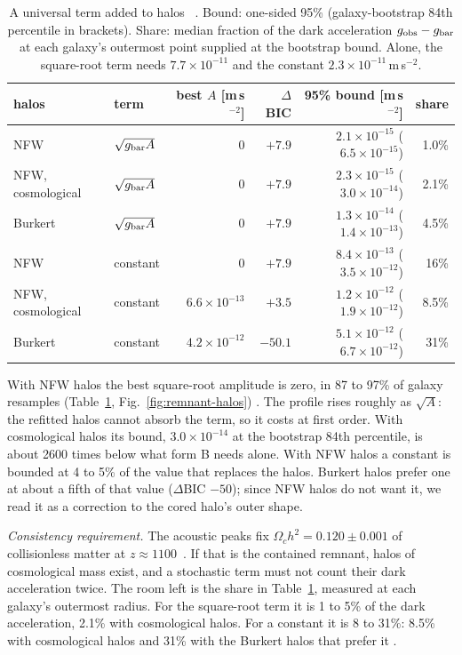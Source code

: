 \begin{table}[t]
\centering\footnotesize
\caption{A universal term added to halos \tagS\ . Bound: one-sided 95\% (galaxy-bootstrap 84th percentile in brackets).
Share: median fraction of the dark acceleration $g_{\rm obs}-g_{\rm bar}$ at each galaxy's outermost point supplied at the bootstrap bound.
Alone, the square-root term needs $7.7\times10^{-11}$ and the constant $2.3\times10^{-11}$\,m\,s$^{-2}$.}
\label{tab:remnant-joint}
\begin{tabular}{llrrrr}
\toprule
halos & term & best $A$ [m\,s$^{-2}$] & $\Delta$BIC & 95\% bound [m\,s$^{-2}$] & share\\
\midrule
NFW & $\sqrt{g_{\rm bar}A}$ & 0 & $+7.9$ & $2.1\times10^{-15}$ ($6.5\times10^{-15}$) & 1.0\%\\
NFW, cosmological & $\sqrt{g_{\rm bar}A}$ & 0 & $+7.9$ & $2.3\times10^{-15}$ ($3.0\times10^{-14}$) & 2.1\%\\
Burkert & $\sqrt{g_{\rm bar}A}$ & 0 & $+7.9$ & $1.3\times10^{-14}$ ($1.4\times10^{-13}$) & 4.5\%\\
NFW & constant & 0 & $+7.9$ & $8.4\times10^{-13}$ ($3.5\times10^{-12}$) & 16\%\\
NFW, cosmological & constant & $6.6\times10^{-13}$ & $+3.5$ & $1.2\times10^{-12}$ ($1.9\times10^{-12}$) & 8.5\%\\
Burkert & constant & $4.2\times10^{-12}$ & $-50.1$ & $5.1\times10^{-12}$ ($6.7\times10^{-12}$) & 31\%\\
\bottomrule
\end{tabular}
\end{table}

With NFW halos the best square-root amplitude is zero, in 87 to 97\% of galaxy resamples (Table~\ref{tab:remnant-joint},
Fig.~\ref{fig:remnant-halos}) \tagS. The profile rises roughly as $\sqrt A$: the refitted halos cannot absorb the term, so it costs at first
order. With cosmological halos its bound, $3.0\times10^{-14}$ at the bootstrap 84th percentile, is about 2600 times below what form B needs
alone. With NFW halos a constant is bounded at 4 to 5\% of the value that replaces the halos. Burkert halos prefer one at about a fifth of
that value ($\Delta$BIC $-50$); since NFW halos do not want it, we read it as a correction to the cored halo's outer shape.

\emph{Consistency requirement.} The acoustic peaks fix $\Omega_ch^2=0.120\pm0.001$ of collisionless matter at $z\approx1100$~\cite{planck18}.
If that is the contained remnant, halos of cosmological mass exist, and a stochastic term must not count their dark acceleration twice. The
room left is the share in Table~\ref{tab:remnant-joint}, measured at each galaxy's outermost radius. For the square-root term it is 1 to 5\%
of the dark acceleration, 2.1\% with cosmological halos. For a constant it is 8 to 31\%: 8.5\% with cosmological halos and 31\% with the
Burkert halos that prefer it .

